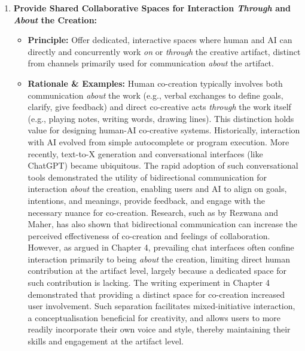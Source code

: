 \begin{enumerate}[label=\arabic*., wide, labelindent=0pt]
\item \textbf{Provide Shared Collaborative Spaces for Interaction \textit{Through} and \textit{About} the Creation:}
    \begin{itemize}[label=\textbullet, leftmargin=*]
        \item \textbf{Principle:} Offer dedicated, interactive spaces where human and AI can directly and concurrently work \textit{on} or \textit{through} the creative artifact, distinct from channels primarily used for communication \textit{about} the artifact.
        \item \textbf{Rationale \& Examples:} Human co-creation typically involves both communication \textit{about} the work (e.g., verbal exchanges to define goals, clarify, give feedback) and direct co-creative acts \textit{through} the work itself (e.g., playing notes, writing words, drawing lines). This distinction holds value for designing human-AI co-creative systems. Historically, interaction with AI evolved from simple autocomplete or program execution. More recently, text-to-X generation and conversational interfaces (like ChatGPT) became ubiquitous. The rapid adoption of such conversational tools demonstrated the utility of bidirectional communication for interaction \textit{about} the creation, enabling users and AI to align on goals, intentions, and meanings, provide feedback, and engage with the necessary nuance for co-creation. Research, such as by Rezwana and Maher, has also shown that bidirectional communication can increase the perceived effectiveness of co-creation and feelings of collaboration. However, as argued in Chapter 4, prevailing chat interfaces often confine interaction primarily to being \textit{about} the creation, limiting direct human contribution at the artifact level, largely because a dedicated space for such contribution is lacking. The writing experiment in Chapter 4 demonstrated that providing a distinct space for co-creation increased user involvement. Such separation facilitates mixed-initiative interaction, a conceptualisation beneficial for creativity, and allows users to more readily incorporate their own voice and style, thereby maintaining their skills and engagement at the artifact level.
    \end{itemize}


\end{enumerate}
